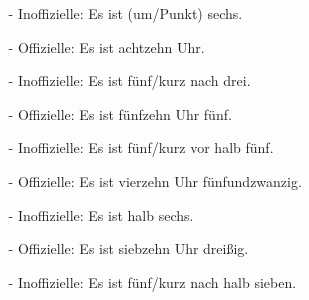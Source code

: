             \RaggedRight{} 
            \begin{multicols}{2}
                \begin{itemize}[before=\renewcommand{\baselinestretch}{1},topsep=0pt,itemsep=4pt,parsep=0pt]
                    \item[] 
                        \begin{itemize}
                            \item[-] Inoffizielle: Es ist (um/Punkt) sechs.
                            \item[-] Offizielle: Es ist achtzehn Uhr.
                        \end{itemize}
                    \item[] {\color{tropical_rain_forest}}
                        \begin{itemize}
                            \item[-] Inoffizielle: {\color{tropical_rain_forest}Es ist  fünf/kurz nach drei.}
                            \item[-] Offizielle: {\color{tropical_rain_forest}Es ist fünfzehn Uhr fünf.}
                        \end{itemize}
                    \item[] {\color{absolute_zero}}
                        \begin{itemize}
                            \item[-] Inoffizielle: {\color{absolute_zero}Es ist  fünf/kurz vor halb fünf.}
                            \item[-] Offizielle: {\color{absolute_zero}Es ist vierzehn Uhr fünfundzwanzig.}
                        \end{itemize}
                    \columnbreak
                    \item[] 
                        \begin{itemize}
                            \item[-] Inoffizielle: Es ist halb sechs.
                            \item[-] Offizielle: Es ist siebzehn Uhr dreißig.
                        \end{itemize}
                    \item[] {\color{saffron}}
                        \begin{itemize}
                            \item[-] Inoffizielle: {\color{saffron}Es ist  fünf/kurz nach halb sieben.}

\end{itemize}
\end{itemize}
\end{multicols}

